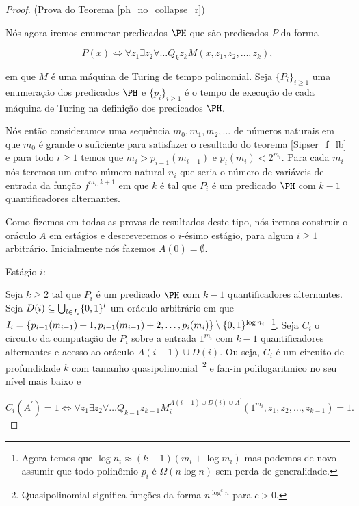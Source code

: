 \begin{proof} (Prova do Teorema \ref{ph_no_collapse_r})

Nós agora iremos enumerar predicados $\PH$ que são predicados $P$ da forma

\begin{equation*}
    P(x) \iff \forall z_{1} \exists z_{2} \forall \dots Q_{k} z_{k} M(x, z_{1}, z_{2}, \dots, z_{k}),
\end{equation*}

em que $M$ é uma máquina de Turing de tempo polinomial. Seja $\{P_{i}\}_{i \geq 1}$ uma enumeração dos predicados $\PH$ e $\{p_{i}\}_{i \geq 1}$ é o tempo de execução de cada máquina de Turing na definição dos predicados $\PH$.

Nós então consideramos uma sequência $m_{0}, m_{1}, m_{2}, \dots$ de números naturais em que $m_{0}$ é grande o suficiente para satisfazer o resultado do teorema \ref{Sipser_f_lb} e para todo $i \geq 1$ temos que $m_{i} > p_{i -1}(m_{i - 1})$ e $p_{i}(m_{i}) < 2^{m_{i}}$. Para cada $m_{i}$ nós teremos um outro número natural $n_{i}$ que seria o número de variáveis de entrada da função $f^{m_{i}, k + 1}$ em que $k$ é tal que $P_{i}$ é um predicado $\PH$ com $k - 1$ quantificadores alternantes.

Como fizemos em todas as provas de resultados deste tipo, nós iremos construir o oráculo $A$ em estágios e descreveremos o $i$-ésimo estágio, para algum $i \geq 1$ arbitrário. Inicialmente nós fazemos $A(0) = \emptyset$.

Estágio $i$:

Seja $k \geq 2$ tal que $P_{i}$ é um predicado $\PH$ com $k - 1$ quantificadores alternantes. Seja $D(i) \subseteq \bigcup_{l \in I_{i}} \{0, 1\}^{l}$ um oráculo arbitrário em que $I_{i} = \{p_{i - 1}(m_{i - 1}) + 1, p_{i - 1}(m_{i - 1}) + 2, \dots, p_{i}(m_{i})\} \setminus \{0, 1\}^{\log n_{i}}$~\footnote{Agora temos que $\log n_{i} \approx (k - 1)(m_{i} + \log m_{i})$ mas podemos de novo assumir que todo polinômio $p_{i}$ é $\Omega(n \log n)$ sem perda de generalidade.}. Seja $C_{i}$ o circuito da computação de $P_{i}$ sobre a entrada $1^{m_{i}}$ com $k - 1$ quantificadores alternantes e acesso ao oráculo $A(i - 1) \cup D(i)$. Ou seja, $C_{i}$ é um circuito de profundidade $k$ com tamanho quasipolinomial~\footnote{Quasipolinomial significa funções da forma $n^{\log^{c} n}$ para $c > 0$.} e fan-in polilogaritmico no seu nível mais baixo e

\begin{equation*}
    C_{i}(A^{\prime}) = 1 \iff \forall z_{1} \exists z_{2} \forall \dots Q_{k - 1} z_{k - 1} M_{i}^{A(i - 1) \cup D(i) \cup A^{\prime}}(1^{m_{i}}, z_{1}, z_{2}, \dots, z_{k - 1}) = 1.
\end{equation*}


\end{proof}
